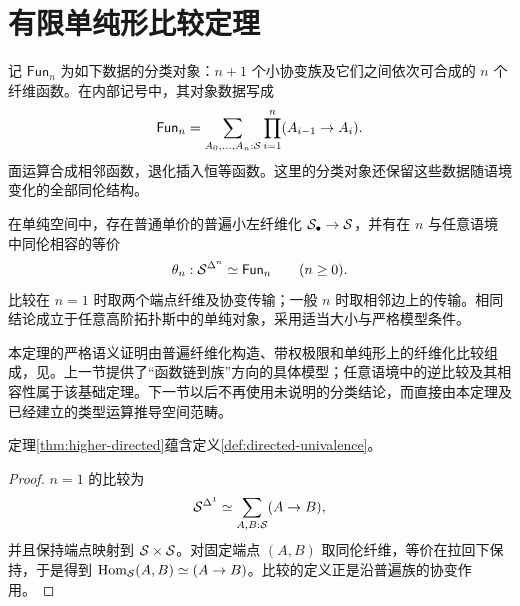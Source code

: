 \section{有限单纯形比较定理}
\begin{definition}[函数链分类对象]
记 $\mathsf{Fun}_n$ 为如下数据的分类对象：$n+1$ 个小协变族及它们之间依次可合成的 $n$ 个纤维函数。在内部记号中，其对象数据写成
\[
\mathsf{Fun}_n=
\sum_{A_0,\ldots,A_n:\mathcal S}
\prod_{i=1}^n(A_{i-1}\to A_i).
\]
面运算合成相邻函数，退化插入恒等函数。这里的分类对象还保留这些数据随语境变化的全部同伦结构。
\end{definition}
\begin{theorem}\label{thm:higher-directed}
在单纯空间中，存在普通单价的普遍小左纤维化 $\mathcal S_\bullet\to\mathcal S$，并有在 $n$ 与任意语境中同伦相容的等价
\[
\theta_n:\mathcal S^{\Delta^n}\simeq\mathsf{Fun}_n
\qquad(n\ge0).
\]
比较在 $n=1$ 时取两个端点纤维及协变传输；一般 $n$ 时取相邻边上的传输。相同结论成立于任意高阶拓扑斯中的单纯对象，采用适当大小与严格模型条件。
\end{theorem}
\begin{remark}
本定理的严格语义证明由普遍纤维化构造、带权极限和单纯形上的纤维化比较组成，见\cite[定理6.2.5]{CavalloRiehlSattler}。上一节提供了“函数链到族”方向的具体模型；任意语境中的逆比较及其相容性属于该基础定理。下一节以后不再使用未说明的分类结论，而直接由本定理及已经建立的类型运算推导空间范畴。
\end{remark}
\begin{proposition}[一维有向单价性]
定理\ref{thm:higher-directed}蕴含定义\ref{def:directed-univalence}。
\end{proposition}
\begin{proof}
$n=1$ 的比较为
\[
\mathcal S^{\Delta^1}\simeq
\sum_{A,B:\mathcal S}(A\to B),
\]
并且保持端点映射到 $\mathcal S\times\mathcal S$。对固定端点 $(A,B)$ 取同伦纤维，等价在拉回下保持，于是得到
$\operatorname{Hom}_\mathcal S(A,B)\simeq(A\to B)$。比较的定义正是沿普遍族的协变作用。
\end{proof}

